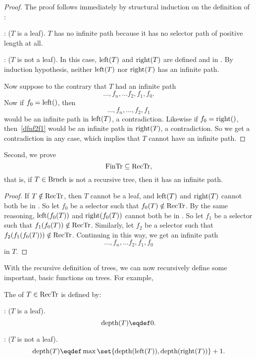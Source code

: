 \begin{proof}
The proof follows immediately by structural induction on the
definition of \rectr:

: ($T$ is a leaf).  $T$ has no infinite path
because it has no selector path of positive length at all.

: ($T$ is not a leaf).  In this case,
$\text{left}(T)$ and $\text{right}(T)$ are defined and in \rectr.  By
induction hypothesis, neither $\text{left}(T)$ nor $\text{right}(T)$ has an
infinite path.

Now suppose to the contrary that $T$ had an infinite path
\[
\dots,f_n,\dots f_2,f_1,f_0.
\]
Now if $f_0 = \leftsub$, then
\begin{equation}\label{dfnf2f1}
\dots,f_n,\dots,f_2,f_1
\end{equation}
would be an infinite path in $\text{left}(T)$, a contradiction.  Likewise
if $f_0 = \rightsub$, then~\eqref{dfnf2f1} would be an infinite path
in $\text{right}(T)$, a contradiction.  So we get a contradiction in any
case, which implies that $T$ cannot have an infinite path.
\end{proof}

Second, we prove
\begin{equation}\label{fintrsubrectr}
\text{FinTr} \subseteq \text{RecTr},
\end{equation}
that is, if $T \in \text{Brnch}$ is not a recursive tree, then it has an
infinite path.

\begin{proof}
If $T \notin \text{RecTr}$, then $T$ cannot be a leaf, and $\text{left}(T)$ and
$\text{right}(T)$ cannot both be in \rectr.  So let $f_0$ be a selector
such that $f_0(T) \notin \text{RecTr}$.  By the same reasoning, 
$\text{left}(f_0(T))$ and $\text{right}(f_0(T))$ cannot both be in
\rectr.  So let $f_1$ be a selector such that $f_1(f_0(T)) \notin
\text{RecTr}$.  Similarly, let $f_2$ be a selector such that $f_2(f_1(f_0(T))) \notin
\text{RecTr}$.  Continuing in this way, we get an infinite path
\[
\dots,f_n,\dots f_2,f_1,f_0
\]
in $T$.
\end{proof}

With the recursive definition of trees, we can now recursively define
some important, basic functions on trees.  For example,

\begin{definition}
The  of $T \in \text{RecTr}$ is defined by:

: ($T$ is a leaf).
\[
\trdpth{T} \eqdef 0.
\]

: ($T$ is not a leaf).
\[
\trdpth{T} \eqdef \max\set{\trdpth{\leftsub{T}}, \trdpth{\rightsub{T}}} + 1.
\]
\end{definition}


